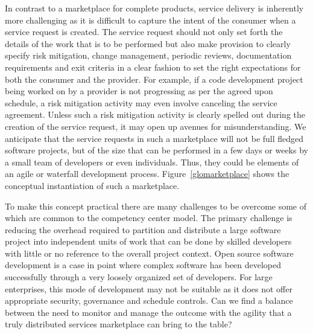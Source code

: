 In contrast to a marketplace for complete products, service delivery is inherently more challenging as it is difficult to capture the intent of the consumer when a service request is created. The service request should not only set forth the details of the work that is to be performed but also make provision to clearly specify risk mitigation, change management, periodic reviews, documentation requirements and exit criteria in a clear fashion to set the right expectations for both the consumer and the provider.  For example, if a code development project being worked on by a provider is not progressing as per the agreed upon schedule, a risk mitigation activity may even involve canceling the service agreement. Unless such a risk mitigation activity is clearly spelled out during the creation of the service request, it may open up avenues for misunderstanding. We anticipate that the service requests in such a marketplace will not be full fledged software projects, but of the size that can be performed in a few days or weeks by a small team of developers or even individuals. Thus, they could be elements of an agile or waterfall development process. Figure~\ref{glomarketplace} shows the conceptual instantiation of such a marketplace.

 To make this concept practical there are many challenges to be overcome some of which are common to the competency center model. The primary challenge is reducing the overhead required to partition and distribute a large software project into independent units of work that can be done by skilled developers with little or no reference to the overall project context. Open source software development is a case in point where complex software has been developed successfully through a very loosely organized set of developers. For large enterprises, this mode of development may not be suitable as it does not offer appropriate security, governance and schedule controls. Can we find a balance between the need to monitor and manage the outcome with the agility that a truly distributed services marketplace can bring to the table?

